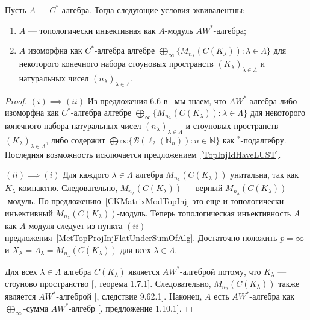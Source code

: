 \begin{theorem}\label{TopInjAWStarAlgCharac} Пусть $A$ --- $C^*$-алгебра. Тогда
следующие условия эквивалентны:

\begin{enumerate}[label = (\roman*)]
    \item $A$ --- топологически инъективная как $A$-модуль $AW^*$-алгебра;

    \item $A$ изоморфна как $C^*$-алгебра алгебре $\bigoplus_\infty
    \{M_{n_\lambda}(C(K_\lambda)):\lambda\in\Lambda \}$ для некоторого конечного
    набора стоуновых пространств ${(K_\lambda)}_{\lambda\in\Lambda}$ 
    и натуральных чисел ${(n_\lambda)}_{\lambda\in\Lambda}$.
\end{enumerate}
\end{theorem}
\begin{proof}$(i) \implies (ii)$ Из предложения 6.6
в~\cite{SmithDecompPropCStarAlg} мы знаем, что $AW^*$-алгебра либо изоморфна как
$C^*$-алгебра алгебре $\bigoplus_\infty
\{M_{n_\lambda}(C(K_\lambda)):\lambda\in\Lambda \}$ для некоторого конечного
набора натуральных чисел ${(n_\lambda)}_{\lambda\in\Lambda}$ и стоуновых
пространств ${(K_\lambda)}_{\lambda\in\Lambda}$, либо содержит 
$\bigoplus \infty \{ \mathcal{B}(\ell_2(\mathbb{N}_n)):n\in\mathbb{N} \}$ 
как ${}^*$-подалгебру. Последняя возможность исключается 
предложением~\ref{TopInjIdHaveLUST}.

$(ii) \implies (i)$ Для каждого $\lambda\in\Lambda$ алгебра
$M_{n_\lambda}(C(K_\lambda))$ унитальна, так как $K_\lambda$ компактно.
Следовательно, $M_{n_\lambda}(C(K_\lambda))$ --- верный
$M_{n_\lambda}(C(K_\lambda))$-модуль. По предложению~\ref{CKMatrixModTopInj} это
еще и топологически инъективный $M_{n_\lambda}(C(K_\lambda))$-модуль. Теперь
топологическая инъективность $A$ как $A$-модуля следует из пункта $(ii)$
предложения~\ref{MetTopProjInjFlatUnderSumOfAlg}. Достаточно положить $p=\infty$
и $X_\lambda=A_\lambda=M_{n_\lambda}(C(K_\lambda))$ для всех
$\lambda\in\Lambda$. 

Для всех $\lambda\in\Lambda$ алгебра $C(K_\lambda)$ является $AW^*$-алгеброй
потому, что $K_\lambda$ --- стоуново пространство [\cite{BerbBaerStarRings},
теорема 1.7.1]. Следовательно, $M_{n_\lambda}(C(K_\lambda))$ также является
$AW^*$-алгеброй [\cite{BerbBaerStarRings}, следствие 9.62.1]. Наконец, $A$ есть
$AW^*$-алгебра как $\bigoplus_\infty$-сумма $AW^*$-алгебр
[\cite{BerbBaerStarRings}, предложение 1.10.1].
\end{proof}

